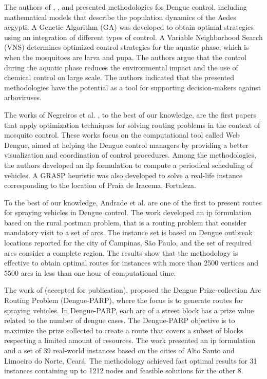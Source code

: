 The authors of \cite{dosreis:2018},   \cite{florentino:2018},    and
\cite{florentino-b:2018} presented methodologies  for Dengue control, including
mathematical models that describe the population dynamics of the  Aedes aegypti.
A Genetic Algorithm (GA) was developed  to obtain  optimal strategies using  an
integration  of different types  of control.  A Variable  Neighborhood Search
(VNS) determines  optimized control strategies for the aquatic phase, which is
when the mosquitoes are larva and pupa.  The authors argue that  the control
during the  aquatic phase reduces the environmental  impact and the  use of
chemical  control on large  scale. The authors indicated that the presented
methodologies  have the potential as a tool for supporting decision-makers
against arboviruses.

The works of Negreiros et al.
\cite{negreiros:2008,negreiros:2011,negreiros-2020}, to the best of our
knowledge, are the first papers that apply optimization techniques for solving
routing problems  in the context of mosquito control.  These works focus on the
computational tool called Web Dengue, aimed at helping the Dengue control
managers  by  providing  a  better visualization  and  coordination  of  control
procedures.  Among  the  methodologies,   the  authors  developed  an  \gls{ilp}
formulation to  compute a periodical  scheduling of vehicles. A  GRASP heuristic
was also developed  to solve a real-life instance corresponding  to the location
of Praia de Iracema, Fortaleza.

To the best of our knowledge, Andrade et al. \cite{andrade:2021} are one of the
first to present routes for spraying vehicles in Dengue control. The work
developed an \gls{ip} formulation based on the rural postman problem, that is a
routing problem that consider mandatory visit to a set of arcs. The instance set
is based on Dengue outbreak locations reported for the city of Campinas, São
Paulo, and the set of required arcs consider a complete region. The results show
that the methodology is effective to obtain optimal routes for instances with
more than 2500 vertices and 5500 arcs in less than one hour of computational
time.

The work of \cite{araujo:2022} (accepted for publication),
proposed the Dengue Prize-collection Arc Routing Problem (Dengue-PARP), where
the focus is to generate routes for spraying vehicles. In Dengue-PARP, each arc
of a street block has a prize value related to the number of dengue cases. The
Dengue-PARP objective is to maximize the prize collected to create a route that
covers a subset of blocks respecting a limited amount of resources. The work
presented an \gls{ip} formulation and a set of 39 real-world instances based on
the cities of Alto Santo and Limoeiro do Norte, Ceará. The methodology achieved
fast optimal results for 31 instances containing up to 1212 nodes and feasible
solutions for the other 8.

